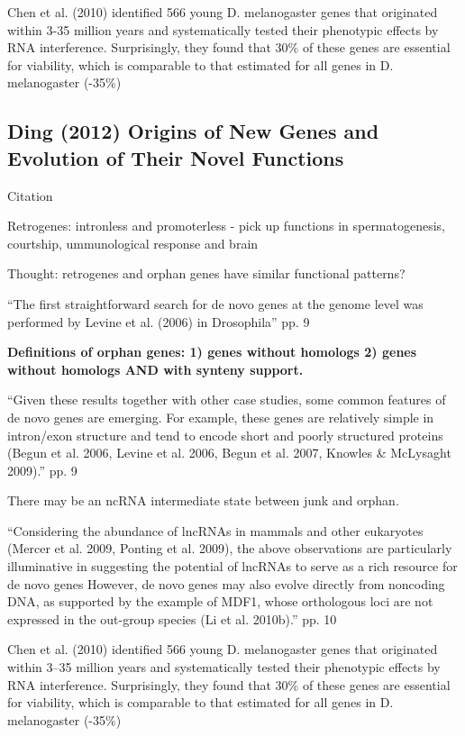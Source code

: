     Chen et al. (2010) identified 566 young D. melanogaster genes that
    originated within 3-35 million years and systematically tested their
    phenotypic effects by RNA interference. Surprisingly, they found that
    30\% of these genes are essential for viability, which is comparable to
    that estimated for all genes in D. melanogaster (-35\%)

\subsection{Ding (2012) Origins of New Genes and Evolution of Their Novel
Functions}

    Citation \cite{ding_origins_2012}
    
    Retrogenes: intronless and promoterless - pick up functions in
    spermatogenesis, courtship, ummunological response and brain

    Thought: retrogenes and orphan genes have similar functional patterns?

    ``The first straightforward search for de novo genes at the genome
    level was performed by Levine et al. (2006) in Drosophila'' pp. 9

    \textbf{Definitions of orphan genes: 1) genes without homologs 2) genes
    without homologs AND with synteny support.}

    ``Given these results together with other case studies, some common
    features of de novo genes are emerging. For example, these genes are
    relatively simple in intron/exon structure and tend to encode short and
    poorly structured proteins (Begun et al. 2006, Levine et al. 2006,
    Begun et al. 2007, Knowles \& McLysaght 2009).'' pp. 9

    There may be an ncRNA intermediate state between junk and orphan.

    ``Considering the abundance of lncRNAs in mammals and other eukaryotes
    (Mercer et al. 2009, Ponting et al. 2009), the above observations are
    particularly illuminative in suggesting the potential of lncRNAs to
    serve as a rich resource for de novo genes However, de novo genes may
    also evolve directly from noncoding DNA, as supported by the example of
    MDF1, whose orthologous loci are not expressed in the out-group species
    (Li et al. 2010b).'' pp. 10


    Chen et al. (2010) identified 566 young D. melanogaster genes that
    originated within 3–35 million years and systematically tested their
    phenotypic effects by RNA interference. Surprisingly, they found that
    30\% of these genes are essential for viability, which is comparable to
    that estimated for all genes in D. melanogaster (-35\%)

